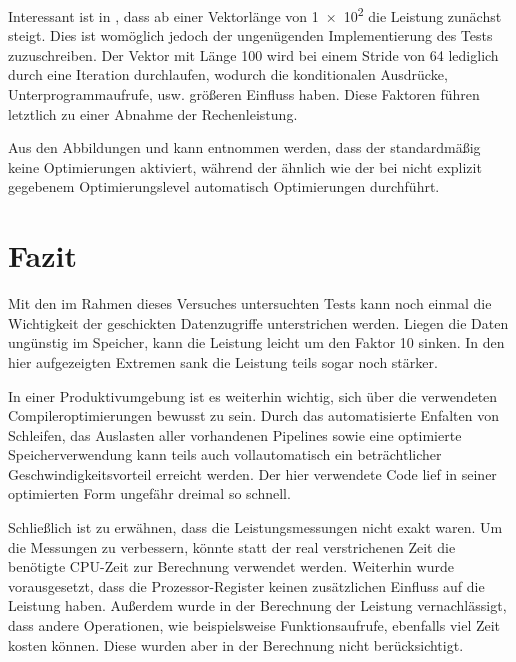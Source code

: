 Interessant ist in , dass ab einer Vektorlänge von \num{1e2} die
Leistung zunächst steigt. Dies ist womöglich jedoch der ungenügenden Implementierung
des Tests zuzuschreiben. Der Vektor mit Länge 100 wird bei einem Stride von 64
lediglich durch eine Iteration durchlaufen, wodurch die konditionalen Ausdrücke,
Unterprogrammaufrufe, usw. größeren Einfluss haben. Diese Faktoren führen letztlich
zu einer Abnahme der Rechenleistung.

Aus den Abbildungen  und  kann entnommen werden,
dass der \gcc standardmäßig keine Optimierungen aktiviert, während der \icc ähnlich
wie der \pgcc bei nicht explizit gegebenem Optimierungslevel automatisch Optimierungen
durchführt.

\section{Fazit}

Mit den im Rahmen dieses Versuches untersuchten Tests kann noch einmal die
Wichtigkeit der geschickten Datenzugriffe unterstrichen werden. Liegen die Daten
ungünstig im Speicher, kann die Leistung leicht um den Faktor 10 sinken.
In den hier aufgezeigten Extremen sank die Leistung teils sogar noch stärker.

In einer Produktivumgebung ist es weiterhin wichtig, sich über die verwendeten
Compileroptimierungen bewusst zu sein. Durch das automatisierte Enfalten von
Schleifen, das Auslasten aller vorhandenen Pipelines sowie eine optimierte
Speicherverwendung kann teils auch vollautomatisch ein beträchtlicher Geschwindigkeitsvorteil
erreicht werden. Der hier verwendete Code lief in seiner optimierten Form ungefähr
dreimal so schnell.

Schließlich ist zu erwähnen, dass die Leistungsmessungen nicht exakt waren. Um die
Messungen zu verbessern, könnte statt der real verstrichenen Zeit die
benötigte CPU-Zeit zur Berechnung verwendet werden. Weiterhin
wurde vorausgesetzt, dass die Prozessor-Register keinen zusätzlichen Einfluss auf 
die Leistung haben. Außerdem wurde in der Berechnung der Leistung vernachlässigt,
dass andere Operationen, wie beispielsweise Funktionsaufrufe, ebenfalls viel Zeit
kosten können. Diese wurden aber in der Berechnung nicht berücksichtigt.